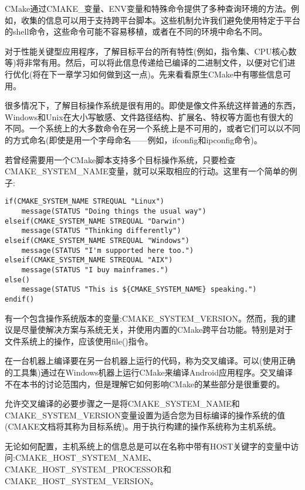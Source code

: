 
CMake通过CMAKE\_变量、ENV变量和特殊命令提供了多种查询环境的方法。例如，收集的信息可以用于支持跨平台脚本。这些机制允许我们避免使用特定于平台的shell命令，这些命令可能不容易移植，或者在不同的环境中命名不同。

对于性能关键型应用程序，了解目标平台的所有特性(例如，指令集、CPU核心数等)将非常有用。然后，可以将此信息传递给已编译的二进制文件，以便对它们进行优化(将在下一章学习如何做到这一点)。先来看看原生CMake中有哪些信息可用。


很多情况下，了解目标操作系统是很有用的。即使是像文件系统这样普通的东西，Windows和Unix在大小写敏感、文件路径结构、扩展名、特权等方面也有很大的不同。一个系统上的大多数命令在另一个系统上是不可用的，或者它们可以以不同的方式命名(即使是用一个字母命名——例如，ifconfig和ipconfig命令)。

若曾经需要用一个CMake脚本支持多个目标操作系统，只要检查CMAKE\_SYSTEM\_NAME变量，就可以采取相应的行动。这里有一个简单的例子:

\begin{lstlisting}[style=styleCMake]
if(CMAKE_SYSTEM_NAME STREQUAL "Linux")
	message(STATUS "Doing things the usual way")
elseif(CMAKE_SYSTEM_NAME STREQUAL "Darwin")
	message(STATUS "Thinking differently")
elseif(CMAKE_SYSTEM_NAME STREQUAL "Windows")
	message(STATUS "I'm supported here too.")
elseif(CMAKE_SYSTEM_NAME STREQUAL "AIX")
	message(STATUS "I buy mainframes.")
else()
	message(STATUS "This is ${CMAKE_SYSTEM_NAME} speaking.")
endif()
\end{lstlisting}

有一个包含操作系统版本的变量:CMAKE\_SYSTEM\_VERSION。然而，我的建议是尽量使解决方案与系统无关，并使用内置的CMake跨平台功能。特别是对于文件系统上的操作，应该使用file()指令。


在一台机器上编译要在另一台机器上运行的代码，称为交叉编译。可以(使用正确的工具集)通过在Windows机器上运行CMake来编译Android应用程序。交叉编译不在本书的讨论范围内，但是理解它如何影响CMake的某些部分是很重要的。

允许交叉编译的必要步骤之一是将CMAKE\_SYSTEM\_NAME和CMAKE\_SYSTEM\_VERSION变量设置为适合您为目标编译的操作系统的值(CMAKE文档将其称为目标系统)。用于执行构建的操作系统称为主机系统。

无论如何配置，主机系统上的信息总是可以在名称中带有HOST关键字的变量中访问:CMAKE\_HOST\_SYSTEM\_NAME、CMAKE\_HOST\_SYSTEM\_PROCESSOR和CMAKE\_HOST\_SYSTEM\_VERSION。

